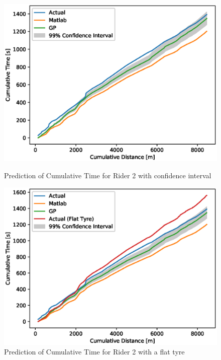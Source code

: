 \documentclass[a4paper, 10pt]{article}
\numberwithin{equation}{section}
\begin{document}
\begin{figure}[h!]
\centering
\begin{minipage}{.5\textwidth}
  \centering
        \includegraphics[width=\textwidth]{images/GP_Fault/RR_cumulative_confidence_full_fleet.eps}
        \caption{Prediction of Cumulative Time for Rider 2 with confidence interval}
        \label{fig:rr_cum_time_confidence}
\end{minipage}%
\begin{minipage}{.5\textwidth}
  \centering
        \includegraphics[width=\textwidth]{images/GP_Fault/RR_flat_cumulative_confidence_full_fleet.eps}
        \caption{Prediction of Cumulative Time for Rider 2 with a flat tyre}
        \label{fig:rr_cum_time_confidence_flat}
\end{minipage}
\end{figure}
\end{document}
